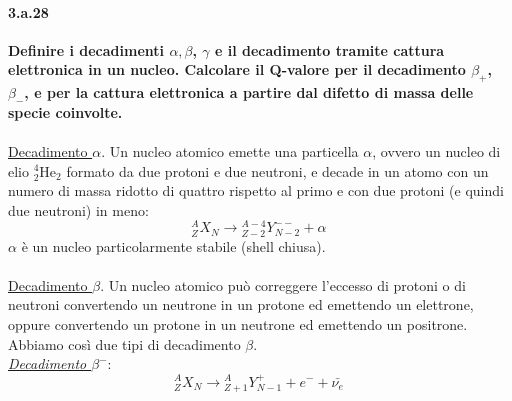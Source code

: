 \documentclass[twoside]{article}
\begin{document}
\paragraph{3.a.28}\textbf{Definire i decadimenti $\alpha, \beta$, $\gamma$ e il decadimento tramite cattura elettronica in un nucleo. Calcolare il Q-valore per il decadimento $\beta_+$, $\beta_-$, e per la cattura elettronica a partire dal difetto di massa delle specie coinvolte.}\\
\\
\underline{Decadimento $\alpha$}. Un nucleo atomico emette una particella $\alpha$, ovvero un nucleo di elio ${}_2^4$He$_2$ formato da due protoni e due neutroni, e decade in un atomo con un numero di massa ridotto di quattro rispetto al primo e con due protoni (e quindi due neutroni) in meno:
\begin{equation}
{}_{Z}^{A}X_N \longrightarrow {}_{Z-2}^{A-4}Y_{N-2}^{--}+ \alpha \, 
\end{equation}
$\alpha$ è un nucleo particolarmente stabile (shell chiusa).\\
\\
\underline{Decadimento $\beta$}. Un nucleo atomico può correggere l'eccesso di protoni o di neutroni convertendo un neutrone in un protone ed emettendo un elettrone, oppure convertendo un protone in un neutrone ed  emettendo un positrone. Abbiamo così due tipi di decadimento $\beta$. \\
\textit{\underline{Decadimento $\beta ^-$}}:
\begin{equation}
{}_{Z}^{A}X_N \longrightarrow {}_{Z+1}^{A}Y_{N-1}^+ + e^- + \bar{\nu_e}\, 
\end{equation}
\end{document}
